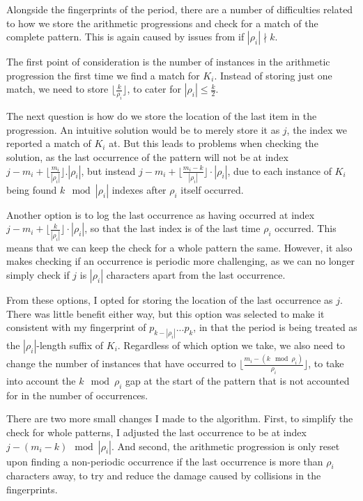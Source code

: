 \documentclass[ %
                    author={Dominic Joseph Moylett},
                    degree={MEng},
                     title={Dictionary Matching with Fingerprints},
                  subtitle={An Empirical Analysis},
                      type={research},
                      year={2015} ]{dissertation}
\begin{document}
Alongside the fingerprints of the period, there are a number of difficulties related to how we store the arithmetic progressions and check for a match of the complete pattern. This is again caused by issues from if $|\rho_i| \nmid k$.

The first point of consideration is the number of instances in the arithmetic progression the first time we find a match for $K_i$. Instead of storing just one match, we need to store $\lfloor\frac{k}{\rho_i}\rfloor$, to cater for $|\rho_i| \leq \frac{k}{2}$.

The next question is how do we store the location of the last item in the progression. An intuitive solution would be to merely store it as $j$, the index we reported a match of $K_i$ at. But this leads to problems when checking the solution, as the last occurrence of the pattern will not be at index $j - m_i + \lfloor\frac{m_i}{|\rho_i|}\rfloor.|\rho_i|$, but instead $j - m_i + \lfloor\frac{m_i - k}{|\rho_i|}\rfloor\cdot|\rho_i|$, due to each instance of $K_i$ being found $k \mod |\rho_i|$ indexes after $\rho_i$ itself occurred.

Another option is to log the last occurrence as having occurred at index $j - m_i + \lfloor\frac{k}{|\rho_i|}\rfloor\cdot|\rho_i|$, so that the last index is of the last time $\rho_i$ occurred. This means that we can keep the check for a whole pattern the same. However, it also makes checking if an occurrence is periodic more challenging, as we can no longer simply check if $j$ is $|\rho_i|$ characters apart from the last occurrence.

From these options, I opted for storing the location of the last occurrence as $j$. There was little benefit either way, but this option was selected to make it consistent with my fingerprint of $p_{k - |\rho_i|}...p_k$, in that the period is being treated as the $|\rho_i|$-length suffix of $K_i$. Regardless of which option we take, we also need to change the number of instances that have occurred to $\lfloor \frac{m_i - (k \mod \rho_i)}{\rho_i} \rfloor$, to take into account the $k \mod \rho_i$ gap at the start of the pattern that is not accounted for in the number of occurrences.

There are two more small changes I made to the algorithm. First, to simplify the check for whole patterns, I adjusted the last occurrence to be at index $j - (m_i - k) \mod |\rho_i|$. And second, the arithmetic progression is only reset upon finding a non-periodic occurrence if the last occurrence is more than $\rho_i$ characters away, to try and reduce the damage caused by collisions in the fingerprints.
\end{document}
